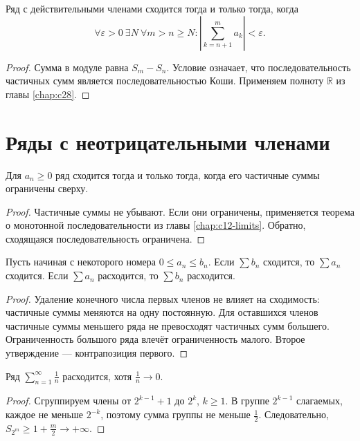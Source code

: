 \ifdim\dimexpr\ht\CatFlowBox+\dp\CatFlowBox\relax<64mm\dp\CatFlowBox=\dimexpr64mm-\ht\CatFlowBox\relax\fi%
\noindent\usebox{\CatFlowBox}\par\addvspace{5pt}

\begin{theorem}\label{thm:legacy-c30-2}
Ряд с действительными членами сходится тогда и только тогда, когда
\[
\forall\varepsilon>0\ \exists N\ \forall m>n\ge N:
\left|\sum_{k=n+1}^{m}a_k\right|<\varepsilon.
\]
\end{theorem}
\begin{proof}
Сумма в модуле равна \(S_m-S_n\). Условие означает, что последовательность частичных сумм является последовательностью Коши. Применяем полноту \(\mathbb R\) из главы \ref{chap:c28}.
\end{proof}
\section{Ряды с неотрицательными членами}
\begin{theorem}\label{thm:legacy-c30-3}
Для \(a_n\ge0\) ряд сходится тогда и только тогда, когда его частичные суммы ограничены сверху.
\end{theorem}
\begin{proof}
Частичные суммы не убывают. Если они ограничены, применяется теорема о монотонной последовательности из главы \ref{chap:c12-limits}. Обратно, сходящаяся последовательность ограничена.
\end{proof}
\begin{theorem}\label{thm:legacy-c30-4}
Пусть начиная с некоторого номера \(0\le a_n\le b_n\). Если \(\sum b_n\) сходится, то \(\sum a_n\) сходится. Если \(\sum a_n\) расходится, то \(\sum b_n\) расходится.
\end{theorem}
\begin{proof}
Удаление конечного числа первых членов не влияет на сходимость: частичные суммы меняются на одну постоянную. Для оставшихся членов частичные суммы меньшего ряда не превосходят частичных сумм большего. Ограниченность большого ряда влечёт ограниченность малого. Второе утверждение — контрапозиция первого.
\end{proof}
\begin{theorem}\label{thm:legacy-c30-5}
Ряд \(\sum_{n=1}^\infty\frac1n\) расходится, хотя \(\frac1n\to0\).
\end{theorem}
\begin{proof}
Сгруппируем члены от \(2^{k-1}+1\) до \(2^k\), \(k\ge1\). В группе \(2^{k-1}\) слагаемых, каждое не меньше \(2^{-k}\), поэтому сумма группы не меньше \(\frac12\). Следовательно, \(S_{2^m}\ge1+\frac m2\to+\infty\).
\end{proof}
